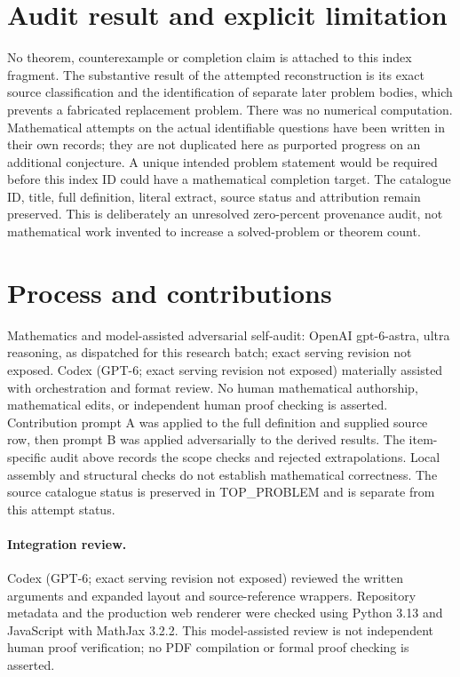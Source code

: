 \documentclass[11pt]{article}
\begin{document}
\section{Audit result and explicit limitation}
No theorem, counterexample or completion claim is attached to this
index fragment. The substantive result of the attempted reconstruction
is its exact source classification and the identification of separate
later problem bodies, which prevents a fabricated replacement problem.
There was no numerical computation. Mathematical attempts on the
actual identifiable questions have been written in their own records;
they are not duplicated here as purported progress on an additional
conjecture. A unique intended problem statement would be required
before this index ID could have a mathematical completion target.
The catalogue ID, title, full definition, literal extract, source
status and attribution remain preserved. This is deliberately an
unresolved zero-percent provenance audit, not mathematical work
invented to increase a solved-problem or theorem count.

\section{Process and contributions}
Mathematics and model-assisted adversarial self-audit: OpenAI gpt-6-astra, ultra reasoning, as dispatched for this research batch; exact serving revision not exposed. Codex (GPT-6; exact serving revision not exposed) materially assisted with orchestration and format review. No human mathematical authorship, mathematical edits, or independent human proof checking is asserted.
Contribution prompt A was applied to the full definition and supplied source row, then prompt B was applied adversarially to the derived results. The item-specific audit above records the scope checks and rejected extrapolations. Local assembly and structural checks do not establish mathematical correctness. The source catalogue status is preserved in TOP\_PROBLEM and is separate from this attempt status.
\paragraph{Integration review.} Codex (GPT-6; exact serving revision not exposed) reviewed the written arguments and expanded layout and source-reference wrappers. Repository metadata and the production web renderer were checked using Python 3.13 and JavaScript with MathJax 3.2.2. This model-assisted review is not independent human proof verification; no PDF compilation or formal proof checking is asserted.
\end{document}
